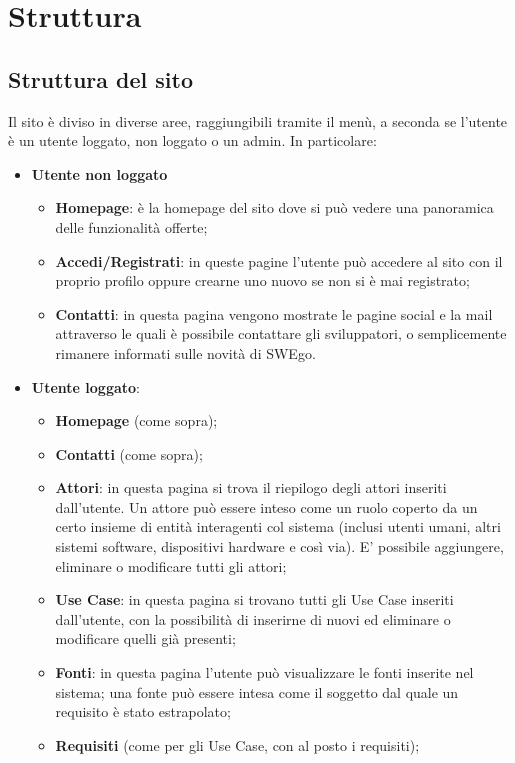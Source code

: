 \section{Struttura}
\subsection{Struttura del sito}
Il sito è diviso in diverse aree, raggiungibili tramite il menù, a seconda se l'utente è un utente loggato, non loggato o un admin. In particolare:
\begin{itemize}
	\item \textbf{Utente non loggato}
	\begin{itemize}
		\item \textbf{Homepage}: è la homepage del sito dove si può vedere una panoramica delle funzionalità offerte;
		\item \textbf{Accedi/Registrati}: in queste pagine l'utente può accedere al sito con il proprio profilo oppure crearne uno nuovo se non si è mai registrato;
		\item \textbf{Contatti}: in questa pagina vengono mostrate le pagine social e la mail attraverso le quali è possibile contattare gli sviluppatori, o semplicemente rimanere informati sulle novità di SWEgo.
	\end{itemize}
	\item \textbf{Utente loggato}:
	\begin{itemize}
		\item \textbf{Homepage} (come sopra);
		\item \textbf{Contatti} (come sopra);
		\item \textbf{Attori}: in questa pagina si trova il riepilogo degli attori inseriti dall'utente. Un attore può essere inteso come un ruolo coperto da un certo insieme di entità interagenti col sistema (inclusi utenti umani, altri sistemi software, dispositivi hardware e così via). E' possibile aggiungere, eliminare o modificare tutti gli attori;
		\item \textbf{Use Case}: in questa pagina si trovano tutti gli Use Case inseriti dall'utente, con la possibilità di inserirne di nuovi ed eliminare o modificare quelli già presenti;
		\item \textbf{Fonti}: in questa pagina l'utente può visualizzare le fonti inserite nel sistema; una fonte può essere intesa come il soggetto dal quale un requisito è stato estrapolato;
		\item \textbf{Requisiti} (come per gli Use Case, con al posto i requisiti);

\end{itemize}
\end{itemize}
